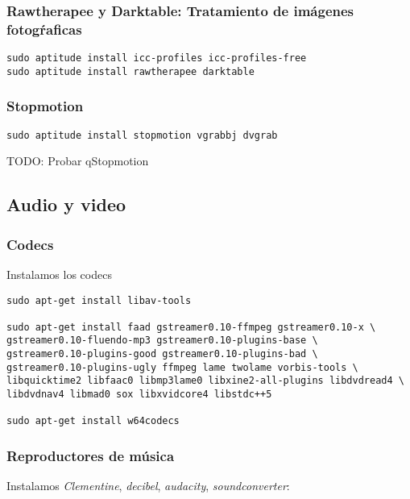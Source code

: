 \documentclass[12pt,spanish,]{article}
\begin{document}
\subsubsection{Rawtherapee y Darktable: Tratamiento de imágenes
fotogŕaficas}\label{rawtherapee-y-darktable-tratamiento-de-imuxe1genes-fotogux155aficas}

\begin{verbatim}
sudo aptitude install icc-profiles icc-profiles-free
sudo aptitude install rawtherapee darktable
\end{verbatim}

\subsubsection{Stopmotion}\label{stopmotion}

\begin{verbatim}
sudo aptitude install stopmotion vgrabbj dvgrab
\end{verbatim}

TODO: Probar qStopmotion

\subsection{Audio y video}\label{audio-y-video}

\subsubsection{Codecs}\label{codecs}

Instalamos los codecs

\begin{verbatim}
sudo apt-get install libav-tools

sudo apt-get install faad gstreamer0.10-ffmpeg gstreamer0.10-x \
gstreamer0.10-fluendo-mp3 gstreamer0.10-plugins-base \
gstreamer0.10-plugins-good gstreamer0.10-plugins-bad \
gstreamer0.10-plugins-ugly ffmpeg lame twolame vorbis-tools \
libquicktime2 libfaac0 libmp3lame0 libxine2-all-plugins libdvdread4 \
libdvdnav4 libmad0 sox libxvidcore4 libstdc++5

sudo apt-get install w64codecs
\end{verbatim}

\subsubsection{Reproductores de
música}\label{reproductores-de-muxfasica}

Instalamos \emph{Clementine}, \emph{decibel}, \emph{audacity},
\emph{soundconverter}:
\end{document}
